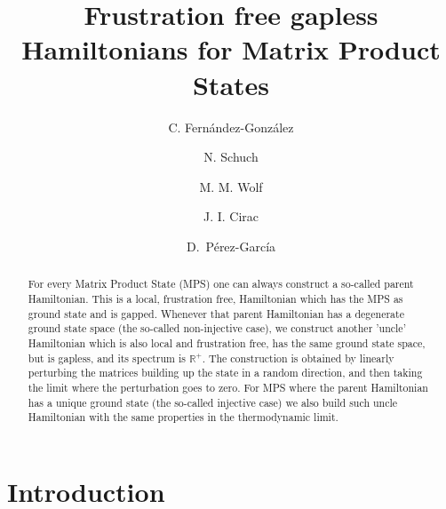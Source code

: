 \documentclass[cmp]{svjour}
\newcommand{\R}{\mathbb{R}}
\begin{document}
\title{Frustration free gapless Hamiltonians for Matrix Product States}


\author{C. Fern\'andez-Gonz\'alez
    \and N. Schuch
    \and M. M. Wolf
    \and J. I. Cirac
    \and D.~P\'erez-Garc\'ia}



\def\makeheadbox{}
\date{}

\maketitle


\begin{abstract}
    For every Matrix Product State (MPS) one can always construct a so-called
    parent Hamiltonian. This is a local, frustration free, Hamiltonian which has
    the MPS as ground state and is gapped. Whenever that
    parent Hamiltonian has a degenerate ground state space (the so-called non-injective case),
    we construct another 'uncle' Hamiltonian which is also local and frustration free, has the same ground state space, but is
    gapless, and its spectrum is $\R^+$. The construction is obtained by linearly
    perturbing the matrices building up the state in a random direction, and then taking the limit
    where the perturbation goes to zero. For MPS where the parent
    Hamiltonian has a unique ground state (the so-called injective case) we
    also build such uncle Hamiltonian with the same properties in the
    thermodynamic limit.
\end{abstract}





\section{Introduction}
\end{document}
